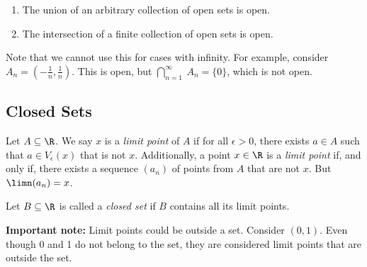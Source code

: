 \begin{theorem}
    \begin{enumerate}[label=(\roman*)]
        \item The union of an arbitrary collection of open sets is open.
        \item The intersection of a finite collection of open sets is open.
    \end{enumerate}
\end{theorem}


Note that we cannot use this for cases with infinity. For example, consider \(A_n = (-\frac{1}{n}, \frac{1}{n})\). This is open, but \(\bigcap_{n = 1}^\infty\ A_n = \{0\}\), which is not open.

\subsection{Closed Sets}

\begin{definition}
    Let \(A \subseteq \R\). We say \(x\) is a \textit{limit point} of \(A\) if for all \(\epsilon > 0\), there exists \(a \in A\) such that \(a \in V_\epsilon(x)\) that is not \(x\). Additionally, a point \(x \in \R\) is a \textit{limit point} if, and only if, there exists a sequence \((a_n)\) of points from \(A\) that are not \(x\). But \(\limn(a_n) = x\).
\end{definition}

\begin{definition}
    Let \(B \subseteq \R\) is called a \textit{closed set} if \(B\) contains all its limit points.
\end{definition}

\begin{note}
    \textbf{Important note:} Limit points could be outside a set. Consider \((0,1)\). Even though 0 and 1 do not belong to the set, they are considered limit points that are outside the set.
\end{note}

